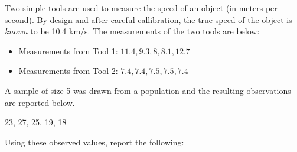 \documentclass{examsetup}\usepackage[]{graphicx}\usepackage[]{color}
\begin{document}



\examCoverPage

\begin{questions}
\question



Two simple tools are used to measure the speed of an object (in meters per second). 
By design and after careful callibration, the true speed of the object is \textit{known} to be 10.4 km/s.
The measurements of the two tools are below: 

\begin{itemize}

   \item Measurements from Tool 1: $ 11.4, 9.3, 8, 8.1, 12.7 $ \\

   \item Measurements from Tool 2: $ 7.4, 7.4, 7.5, 7.5, 7.4 $ \\

\end{itemize}



\vspace{1cm}

\question 



A sample of size 5 was drawn from a population and the resulting observations are reported below. 
\begin{center}
23, 27, 25, 19, 18
\end{center}
Using these observed values, report the following:
\vspace{1cm}


\end{questions}
\end{document}
